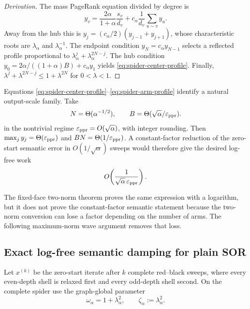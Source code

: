 \begin{proof}[Derivation]
The mass PageRank equation divided by degree is
\begin{equation*}
 y_v=\frac{2\alpha}{1+\alpha}\frac{s_v}{d_v}
 +c_\alpha\frac1{d_v}\sum_{u\sim v}y_u.
\end{equation*}
Away from the hub this is
$y_j=(c_\alpha/2)(y_{j-1}+y_{j+1})$, whose characteristic roots are
$\lambda_\alpha$ and $\lambda_\alpha^{-1}$.  The endpoint condition
$y_N=c_\alpha y_{N-1}$ selects a reflected profile proportional to
$\lambda_\alpha^j+\lambda_\alpha^{2N-j}$.  The hub condition
$y_0=2\alpha/((1+\alpha)B)+c_\alpha y_1$ yields
\eqref{eq:spider-center-profile}.  Finally,
$\lambda^j+\lambda^{2N-j}\leq1+\lambda^{2N}$ for $0<\lambda<1$.
\end{proof}

Equations \eqref{eq:spider-center-profile}--\eqref{eq:spider-arm-profile}
identify a natural output-scale family.  Take
\begin{equation}
 N=\Theta(\alpha^{-1/2}),
 \qquad
 B=\Theta(\sqrt\alpha/\varepsilon_{\rm ppr}).
 \label{eq:spider-output-scale-family}
\end{equation}
in the nontrivial regime
$\varepsilon_{\rm ppr}=O(\sqrt\alpha)$, with integer rounding.
Then $\max_j y_j=\Theta(\varepsilon_{\rm ppr})$ and
$BN=\Theta(1/\varepsilon_{\rm ppr})$.  A constant-factor reduction of the
zero-start semantic error in $O(1/\sqrt\alpha)$ sweeps would therefore give
the desired log-free work
\begin{equation}
 O\!\left(\frac1{\sqrt\alpha\,\varepsilon_{\rm ppr}}\right).
 \label{eq:spider-desired-log-free}
\end{equation}

The fixed-face two-norm theorem proves the same expression with a logarithm,
but it does not prove the constant-factor semantic statement because the
two-norm conversion can lose a factor depending on the number of arms.  The
following maximum-norm wave argument removes that loss.

\subsection{Exact log-free semantic damping for plain SOR}

Let $x^{(k)}$ be the zero-start iterate after $k$ complete red--black sweeps,
where every even-depth shell is relaxed first and every odd-depth shell
second.  On the complete spider use the graph-global parameter
\begin{equation}
 \omega_\alpha=1+\lambda_\alpha^2,
 \qquad
 \zeta_\alpha:=\lambda_\alpha^2.
 \label{eq:radial-sor-parameters}
\end{equation}

